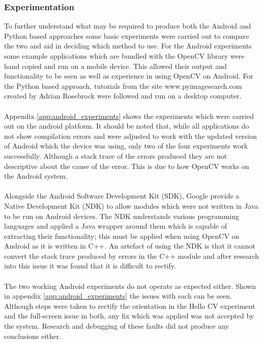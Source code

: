 	\subsubsection{Experimentation}
		To further understand what may be required to produce both the Android and Python based approaches some basic experiments were carried out to compare the two and aid in deciding which method to use. For the Android experiments some example applications which are bundled with the OpenCV library were hand copied and run on a mobile device. This allowed their output and functionality to be seen as well as experience in using OpenCV on Android. For the Python based approach, tutorials from the site www.pyimagesearch.com created by Adrian Rosebrock were followed and run on a desktop computer.
		\\\\
		Appendix \ref{app:android_experiments} shows the experiments which were carried out on the android platform. It should be noted that, while all applications do not show compilation errors and were adjusted to work with the updated version of Android which the device was using, only two of the four experiments work successfully. Although a stack trace of the errors produced they are not descriptive about the cause of the error. This is due to how OpenCV works on the Android system.
		\\\\
		Alongside the Android Software Development Kit (SDK), Google provide a Native Development Kit (NDK) to allow modules which were not written in Java to be run on Android devices. The NDK understands various programming languages and applied a Java wrapper around them which is capable of extracting their functionality; this must be applied when using OpenCV on Android as it is written in C++. An artefact of using the NDK is that it cannot convert the stack trace produced by errors in the C++ module and after research into this issue it was found that it is difficult to rectify.
		\\\\
		The two working Android experiments do not operate as expected either. Shown in appendix \ref{app:android_experiments} the issues with each can be seen. Although steps were taken to rectify the orientation in the Hello CV experiment and the full-screen issue in both, any fix which was applied was not accepted by the system. Research and debugging of these faults did not produce any conclusions either.
		\\\\
